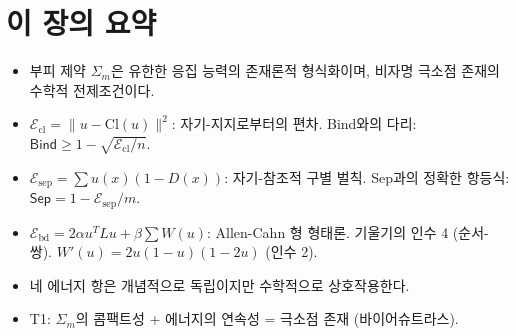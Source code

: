 \section*{이 장의 요약}

\begin{itemize}
    \item 부피 제약 $\Sigma_m$은 유한한 응집 능력의 존재론적 형식화이며, 비자명 극소점 존재의 수학적 전제조건이다.
    \item $\mathcal{E}_{\mathrm{cl}} = \|u - \mathrm{Cl}(u)\|^2$: 자기-지지로부터의 편차. Bind와의 다리: $\mathsf{Bind} \geq 1 - \sqrt{\mathcal{E}_{\mathrm{cl}}/n}$.
    \item $\mathcal{E}_{\mathrm{sep}} = \sum u(x)(1 - D(x))$: 자기-참조적 구별 벌칙. Sep과의 정확한 항등식: $\mathsf{Sep} = 1 - \mathcal{E}_{\mathrm{sep}}/m$.
    \item $\mathcal{E}_{\mathrm{bd}} = 2\alpha u^T L u + \beta \sum W(u)$: Allen-Cahn 형 형태론. 기울기의 인수 4 (순서-쌍). $W'(u) = 2u(1-u)(1-2u)$ (인수 2).
    \item 네 에너지 항은 개념적으로 독립이지만 수학적으로 상호작용한다.
    \item T1: $\Sigma_m$의 콤팩트성 + 에너지의 연속성 = 극소점 존재 (바이어슈트라스).
\end{itemize}
